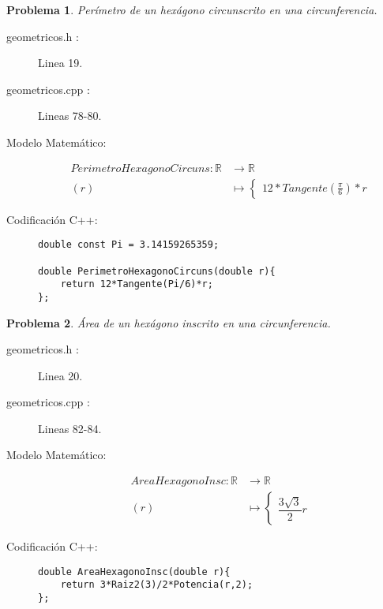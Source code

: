 \documentclass{article}
\theoremstyle{plain}
\theoremstyle{definition}
\newtheorem{problem}{Problema}
\begin{document}
\begin{problem} \emph{Perímetro de un hexágono circunscrito en una circunferencia.}\\
\begin{description}
\item[geometricos.h :] Linea 19. \item[geometricos.cpp :] Lineas 78-80.

\item[Modelo Matemático:]
\begin{align*}
PerimetroHexagonoCircuns: \mathbb{R} &\to \mathbb{R}\\
(r) &\mapsto \begin{cases}
12*Tangente(\frac{\pi}{6})*r
\end{cases}
\end{align*}
%
\item[Codificación \textsf{C++}:]\hfill
%
\begin{verbatim}
double const Pi = 3.14159265359;

double PerimetroHexagonoCircuns(double r){
    return 12*Tangente(Pi/6)*r;
};
\end{verbatim}
\end{description}
\end{problem}

\begin{problem} \emph{Área de un hexágono inscrito en una circunferencia.}\\
\begin{description}
\item[geometricos.h :] Linea 20. \item[geometricos.cpp :] Lineas 82-84.

\item[Modelo Matemático:]
\begin{align*}
AreaHexagonoInsc: \mathbb{R} &\to \mathbb{R}\\
(r) &\mapsto \begin{cases}
\dfrac{3\sqrt{3}}{2}r
\end{cases}
\end{align*}
%
\item[Codificación \textsf{C++}:]\hfill
%
\begin{verbatim}
double AreaHexagonoInsc(double r){
    return 3*Raiz2(3)/2*Potencia(r,2);
};
\end{verbatim}
\end{description}
\end{problem}
\end{document}
